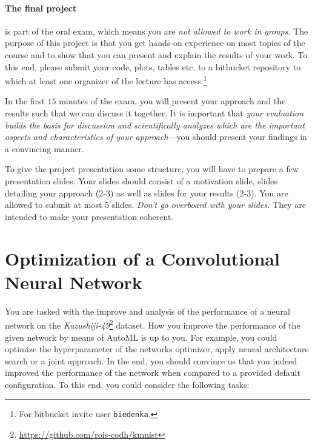 \documentclass[10pt,a4paper]{article}
\begin{document}
	\paragraph{The final project} is part of the oral exam, which means you are \textit{not allowed to work in groups}.
	The purpose of this project is that you get hands-on experience on most topics of the course and to show that you can present and explain the results of your work. 
	To this end, please submit your code, plots, tables etc. to a bitbucket repository to which at least one organizer of the lecture has access.\footnote{
	For bitbucket invite user \texttt{biedenka}.}

	In the first $15$ minutes of the exam, you will present your approach and the results such that we can discuss it together.
	It is important that \textit{your evaluation builds the basis for discussion and scientifically analyzes which are the important aspects and characteristics of your approach}---you should present your findings in a convincing manner.
	
	To give the project presentation some structure, you will have to prepare a few presentation slides.
	Your slides should consist of a motivation slide, slides detailing your approach (2-3) as well as slides for your results (2-3).
	You are allowed to submit at most 5 slides.
	\textit{Don't go overboard with your slides.}
	They are intended to make your presentation coherent.
	
	\section*{Optimization of a Convolutional Neural Network}
		
		You are tasked with the improve and analysis of the performance of a neural network on the \emph{Kuzushiji-49}\footnote{\url{https://github.com/rois-codh/kmnist}} dataset.
		How you improve the performance of the given network by means of AutoML is up to you. 
		For example, you could optimize the hyperparameter of the networks optimizer, apply neural architecture search or a joint approach.
		In the end, you should convince us that you indeed improved the performance of the network when compared to a provided default configuration.
		To this end, you could consider the following tasks:
		
\end{document}
